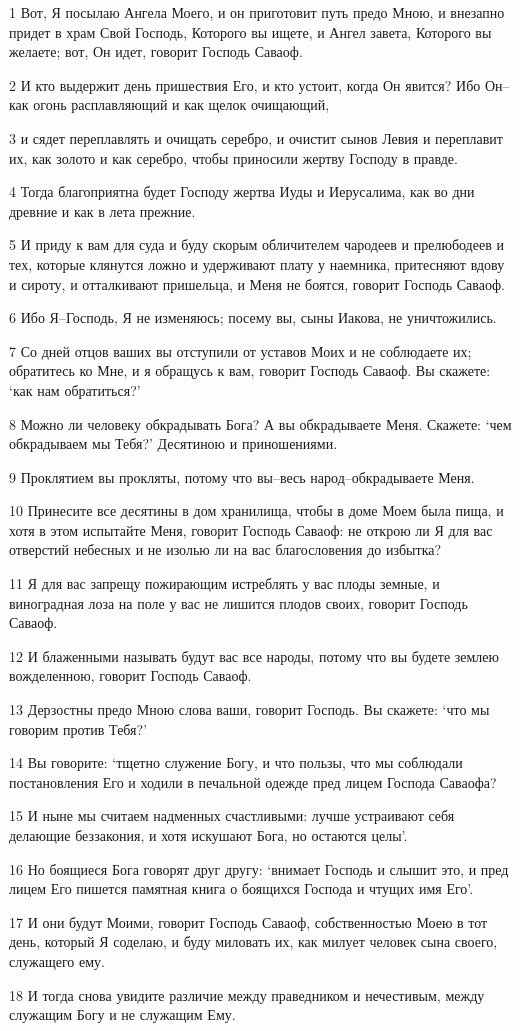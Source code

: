 \par 1 Вот, Я посылаю Ангела Моего, и он приготовит путь предо Мною, и внезапно придет в храм Свой Господь, Которого вы ищете, и Ангел завета, Которого вы желаете; вот, Он идет, говорит Господь Саваоф.
\par 2 И кто выдержит день пришествия Его, и кто устоит, когда Он явится? Ибо Он--как огонь расплавляющий и как щелок очищающий,
\par 3 и сядет переплавлять и очищать серебро, и очистит сынов Левия и переплавит их, как золото и как серебро, чтобы приносили жертву Господу в правде.
\par 4 Тогда благоприятна будет Господу жертва Иуды и Иерусалима, как во дни древние и как в лета прежние.
\par 5 И приду к вам для суда и буду скорым обличителем чародеев и прелюбодеев и тех, которые клянутся ложно и удерживают плату у наемника, притесняют вдову и сироту, и отталкивают пришельца, и Меня не боятся, говорит Господь Саваоф.
\par 6 Ибо Я--Господь, Я не изменяюсь; посему вы, сыны Иакова, не уничтожились.
\par 7 Со дней отцов ваших вы отступили от уставов Моих и не соблюдаете их; обратитесь ко Мне, и я обращусь к вам, говорит Господь Саваоф. Вы скажете: `как нам обратиться?'
\par 8 Можно ли человеку обкрадывать Бога? А вы обкрадываете Меня. Скажете: `чем обкрадываем мы Тебя?' Десятиною и приношениями.
\par 9 Проклятием вы прокляты, потому что вы--весь народ--обкрадываете Меня.
\par 10 Принесите все десятины в дом хранилища, чтобы в доме Моем была пища, и хотя в этом испытайте Меня, говорит Господь Саваоф: не открою ли Я для вас отверстий небесных и не изолью ли на вас благословения до избытка?
\par 11 Я для вас запрещу пожирающим истреблять у вас плоды земные, и виноградная лоза на поле у вас не лишится плодов своих, говорит Господь Саваоф.
\par 12 И блаженными называть будут вас все народы, потому что вы будете землею вожделенною, говорит Господь Саваоф.
\par 13 Дерзостны предо Мною слова ваши, говорит Господь. Вы скажете: `что мы говорим против Тебя?'
\par 14 Вы говорите: `тщетно служение Богу, и что пользы, что мы соблюдали постановления Его и ходили в печальной одежде пред лицем Господа Саваофа?
\par 15 И ныне мы считаем надменных счастливыми: лучше устраивают себя делающие беззакония, и хотя искушают Бога, но остаются целы'.
\par 16 Но боящиеся Бога говорят друг другу: `внимает Господь и слышит это, и пред лицем Его пишется памятная книга о боящихся Господа и чтущих имя Его'.
\par 17 И они будут Моими, говорит Господь Саваоф, собственностью Моею в тот день, который Я соделаю, и буду миловать их, как милует человек сына своего, служащего ему.
\par 18 И тогда снова увидите различие между праведником и нечестивым, между служащим Богу и не служащим Ему.

